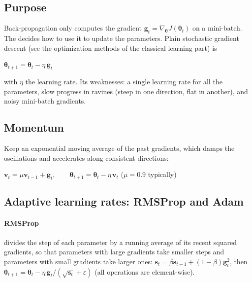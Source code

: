 \subsection{Purpose}
Back-propagation only computes the gradient $\bm{g}_{t}=\nabla_{\bm{\theta}}J\left(
\bm{\theta}_{t}\right)$ on a mini-batch. The  decides how to use it to update
the parameters. Plain stochastic gradient descent (see the optimization methods of the
classical learning part) is
\begin{center}
    $\bm{\theta}_{t+1} = \bm{\theta}_{t} - \eta\,\bm{g}_{t}$
\end{center}
with $\eta$ the learning rate. Its weaknesses: a single learning rate for all the
parameters, slow progress in ravines (steep in one direction, flat in another), and noisy
mini-batch gradients.

\subsection{Momentum}
Keep an exponential moving average of the past gradients, which damps the oscillations and
accelerates along consistent directions:
\begin{center}
    $\bm{v}_{t} = \mu\bm{v}_{t-1} + \bm{g}_{t},\qquad
    \bm{\theta}_{t+1} = \bm{\theta}_{t} - \eta\,\bm{v}_{t}$ \quad ($\mu=0.9$ typically)
\end{center}

\subsection{Adaptive learning rates: RMSProp and Adam}
\paragraph{RMSProp} divides the step of each parameter by a running average of its recent
squared gradients, so that parameters with large gradients take smaller steps and
parameters with small gradients take larger ones:
$\bm{s}_{t} = \beta\bm{s}_{t-1} + (1-\beta)\bm{g}_{t}^{2}$, then
$\bm{\theta}_{t+1} = \bm{\theta}_{t} - \eta\,\bm{g}_{t}/\left(\sqrt{\bm{s}_{t}}+
\varepsilon\right)$ (all operations are element-wise).

